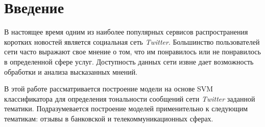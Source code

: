 \section{Введение}
В настоящее время одним из наиболее популярных сервисов распространения
коротких новостей является социальная сеть {\it Twitter}. Большинство пользователей
сети часто выражают свое мнение о том, что им понравилось или не понравилось
в определенной сфере услуг. Доступность данных сети извне дает возможность
обработки и анализа высказанных мнений.

В этой работе рассматривается построение модели на основе SVM классификатора
для определения тональности сообщений сети {\it Twitter} заданной тематики.
Подразумевается построение моделей применительно к следующим тематикам:
отзывы в банковской и телекоммуникационных сферах.
